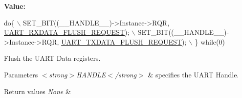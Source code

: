 {\bfseries Value\+:}
\begin{DoxyCode}
\textcolor{keywordflow}{do}\{                \(\backslash\)
      SET\_BIT((\_\_HANDLE\_\_)->Instance->RQR, \hyperlink{group___u_a_r_t___request___parameters_gaf2ee2d4b1bdcbc7772ddc0da89566936}{UART\_RXDATA\_FLUSH\_REQUEST}); \(\backslash\)
      SET\_BIT((\_\_HANDLE\_\_)->Instance->RQR, \hyperlink{group___u_a_r_t___request___parameters_gafecbd800f456ed666a42ac0842cd2c4b}{UART\_TXDATA\_FLUSH\_REQUEST}); \(\backslash\)
    \}  \textcolor{keywordflow}{while}(0)
\end{DoxyCode}


Flush the U\+A\+RT Data registers. 


\begin{DoxyParams}{Parameters}
{\em $<$strong$>$\+H\+A\+N\+D\+L\+E$<$/strong$>$} & specifies the U\+A\+RT Handle. \\
\hline
\end{DoxyParams}

\begin{DoxyRetVals}{Return values}
{\em None} & \\
\hline
\end{DoxyRetVals}
